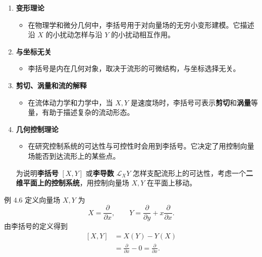 \begin{enumerate}
  \begin{itemize}
    \item 李括号满足\textbf{雅可比恒等式}（Jacobi identity），从而赋予向量场空间\textbf{李代数}（Lie algebra）结构。
    \item 这个代数记录流形对称性及其向量场相互作用的重要信息。
  \end{itemize}
  \item \textbf{变形理论}
  \begin{itemize}
    \item 在物理学和微分几何中，李括号用于对向量场的无穷小变形建模。它描述沿 $X$ 的小扰动怎样与沿 $Y$ 的小扰动相互作用。
  \end{itemize}
  \item \textbf{与坐标无关}
  \begin{itemize}
    \item 李括号是内在几何对象，取决于流形的可微结构，与坐标选择无关。
  \end{itemize}
  \item \textbf{剪切、涡量和流的解释}
  \begin{itemize}
    \item 在流体动力学和力学中，当 $X,Y$ 是速度场时，李括号可表示\textbf{剪切}和\textbf{涡量}等量，有助于描述复杂的流动形态。
  \end{itemize}
  \item \textbf{几何控制理论}
  \begin{itemize}
    \item 在研究控制系统的可达性与可控性时会用到李括号。它决定了用控制向量场能否到达流形上的某些点。
  \end{itemize}
  为说明\textbf{李括号} $[X,Y]$ 或\textbf{李导数} $\mathcal L_XY$ 怎样支配流形上的可达性，考虑一个\textbf{二维平面上的控制系统}，用控制向量场 $X,Y$ 在平面上移动。
\end{enumerate}

\begin{statement}{例 4.6}{}
定义向量场 $X,Y$ 为
\[
  X=\frac{\partial}{\partial x},\qquad
  Y=\frac{\partial}{\partial y}+x\frac{\partial}{\partial x}.
\]
由李括号的定义得到
\[
  \begin{aligned}
    [X,Y]&=X(Y)-Y(X)\\
         &=\frac{\partial}{\partial x}-0
          =\frac{\partial}{\partial x}.
  \end{aligned}
\]
\end{statement}

